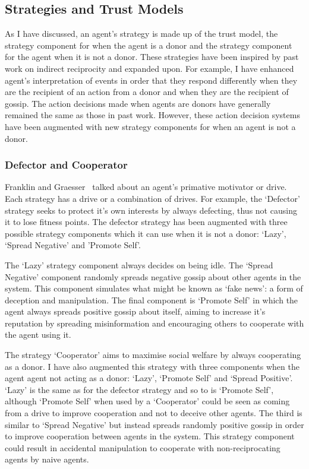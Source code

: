 \documentclass[]{final_report}
\begin{document}
\subsection{Strategies and Trust Models}
\label{subs:stratstrustmodels}
As I have discussed, an agent's strategy is made up of the trust model, the strategy component for when the agent is a donor and the strategy component for the agent when it is not a donor. These strategies have been inspired by past work on indirect reciprocity and expanded upon. For example, I have enhanced agent's interpretation of events in order that they respond differently when they are the recipient of an action from a donor and when they are the recipient of gossip. The action decisions made when agents are donors have generally remained the same as those in past work. However, these action decision systems have been augmented with new strategy components for when an agent is not a donor.\par 
\subsubsection{Defector and Cooperator}
Franklin and Graesser~\cite{franklin1996agent} talked about an agent's primative motivator or drive. Each strategy has a drive or a combination of drives. For example, the `Defector' strategy seeks to protect it's own interests by always defecting, thus not causing it to lose fitness points. The defector strategy has been augmented with three possible strategy components which it can use when it is not a donor: `Lazy', `Spread Negative' and 'Promote Self'.\par
The `Lazy' strategy component always decides on being idle. The `Spread Negative' component randomly spreads negative gossip about other agents in the system. This component simulates what might be known as `fake news': a form of deception and manipulation. The final component is `Promote Self' in which the agent always spreads positive gossip about itself, aiming to increase it's reputation by spreading misinformation and encouraging others to cooperate with the agent using it.\par 
The strategy `Cooperator' aims to maximise social welfare by always cooperating as a donor. I have also augmented this strategy with three components when the agent agent not acting as a donor: `Lazy', `Promote Self' and `Spread Positive'. `Lazy' is the same as for the defector strategy and so to is `Promote Self', although `Promote Self' when used by a `Cooperator' could be seen as coming from a drive to improve cooperation and not to deceive other agents. The third is similar to `Spread Negative' but instead spreads randomly positive gossip in order to improve cooperation between agents in the system. This strategy component could result in accidental manipulation to cooperate with non-reciprocating agents by naive agents.\par 
\end{document}

